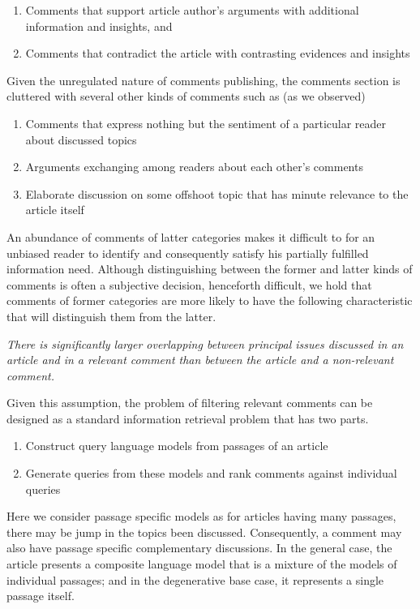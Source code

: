 \documentclass[article]{IEEEtran}
\newcounter{tmpc}
\begin{document}
\begin{enumerate}
\item Comments that support article author's arguments with additional information and insights, and
\item Comments that contradict the article with contrasting evidences and insights
\setcounter{tmpc}{\theenumi}
\end{enumerate}

Given the unregulated nature of comments publishing, the comments section is cluttered with several other kinds of comments such as (as we observed)

\begin{enumerate}
\setcounter{enumi}{\thetmpc}
\item Comments that express nothing but the sentiment of a particular reader about discussed topics
\item Arguments exchanging among readers about each other's comments
\item Elaborate discussion on some offshoot topic that has minute relevance to the article itself
\end{enumerate} 

An abundance of comments of latter categories makes it difficult to for an unbiased reader to identify and consequently satisfy his partially fulfilled information need. Although distinguishing between the former and latter kinds of comments is often a subjective decision, henceforth difficult, we hold that comments of former categories are more likely to have the following characteristic that will distinguish them from the latter.
\bigskip

\textit{There is significantly larger overlapping between principal issues discussed in an article and in a relevant comment than between the article and a non-relevant comment.}    
\bigskip

Given this assumption, the problem of filtering relevant comments can be designed as a standard information retrieval problem that has two parts.

\begin{enumerate}
\item Construct query language models from passages of an article 
\item Generate queries from these models and rank comments against individual queries
\end{enumerate}

Here we consider passage specific models as for articles having many passages, there may be jump in the topics been discussed. Consequently, a comment may also have passage specific complementary discussions. In the general case, the article presents a composite language model that is a mixture of the models of individual passages; and in the degenerative base case, it represents a single passage itself.  
\end{document}
